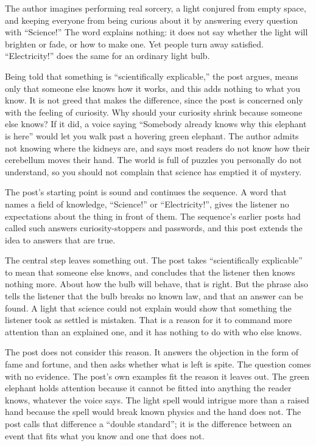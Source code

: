\begin{afterword}
\summaryhead

The author imagines performing real sorcery, a light conjured from empty space, and keeping everyone from being curious about it by answering every question with ``Science!'' The word explains nothing: it does not say whether the light will brighten or fade, or how to make one. Yet people turn away satisfied. ``Electricity!'' does the same for an ordinary light bulb.

Being told that something is ``scientifically explicable,'' the post argues, means only that someone else knows how it works, and this adds nothing to what you know. It is not greed that makes the difference, since the post is concerned only with the feeling of curiosity. Why should your curiosity shrink because someone else knows? If it did, a voice saying ``Somebody already knows why this elephant is here'' would let you walk past a hovering green elephant. The author admits not knowing where the kidneys are, and says most readers do not know how their cerebellum moves their hand. The world is full of puzzles you personally do not understand, so you should not complain that science has emptied it of mystery.

\responsehead

The post's starting point is sound and continues the sequence. A word that names a field of knowledge, ``Science!'' or ``Electricity!'', gives the listener no expectations about the thing in front of them. The sequence's earlier posts had called such answers curiosity-stoppers and passwords, and this post extends the idea to answers that are true.

The central step leaves something out. The post takes ``scientifically explicable'' to mean that someone else knows, and concludes that the listener then knows nothing more. About how the bulb will behave, that is right. But the phrase also tells the listener that the bulb breaks no known law, and that an answer can be found. A light that science could not explain would show that something the listener took as settled is mistaken. That is a reason for it to command more attention than an explained one, and it has nothing to do with who else knows.

The post does not consider this reason. It answers the objection in the form of fame and fortune, and then asks whether what is left is spite. The question comes with no evidence. The post's own examples fit the reason it leaves out. The green elephant holds attention because it cannot be fitted into anything the reader knows, whatever the voice says. The light spell would intrigue more than a raised hand because the spell would break known physics and the hand does not. The post calls that difference a ``double standard''; it is the difference between an event that fits what you know and one that does not.


\end{afterword}
